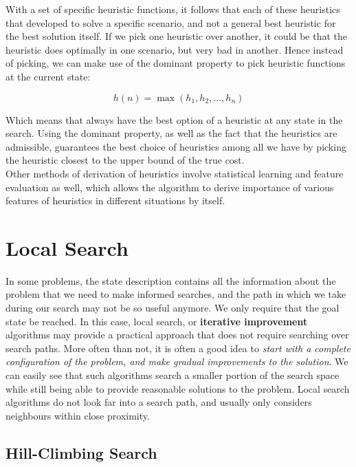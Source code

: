 \documentclass[12pt]{article}
\begin{document}
With a set of specific heuristic functions, it follows that each of these heuristics that developed to solve a specific scenario, and not a general best heuristic for the best solution itself. If we pick one heuristic over another, it could be that the heuristic does optimally in one scenario, but very bad in another. Hence instead of picking, we can make use of the dominant property to pick heuristic functions at the current state:

\begin{equation*}
h(n) = \max (h_1, h_2, ..., h_n)
\end{equation*}

Which means that always have the best option of a heuristic at any state in the search. Using the dominant property, as well as the fact that the heuristics are admissible, guarantees the best choice of heuristics among all we have by picking the heuristic closest to the upper bound of the true cost.\\

Other methods of derivation of heuristics involve statistical learning and feature evaluation as well, which allows the algorithm to derive importance of various features of heuristics in different situations by itself.

\pagebreak
\section{Local Search}

In some problems, the state description contains all the information about the problem that we need to make informed searches, and the path in which we take during our search may not be so useful anymore. We only require that the goal state be reached. In this case, local search, or \textbf{iterative improvement} algorithms may provide a practical approach that does not require searching over search paths. More often than not, it is often a good idea to \textit{start with a complete configuration of the problem, and make gradual improvements to the solution}. We can easily see that such algorithms search a smaller portion of the search space while still being able to provide reasonable solutions to the problem. Local search algorithms do not look far into a search path, and usually only considers neighbours within close proximity.

\subsection{Hill-Climbing Search}
\end{document}
